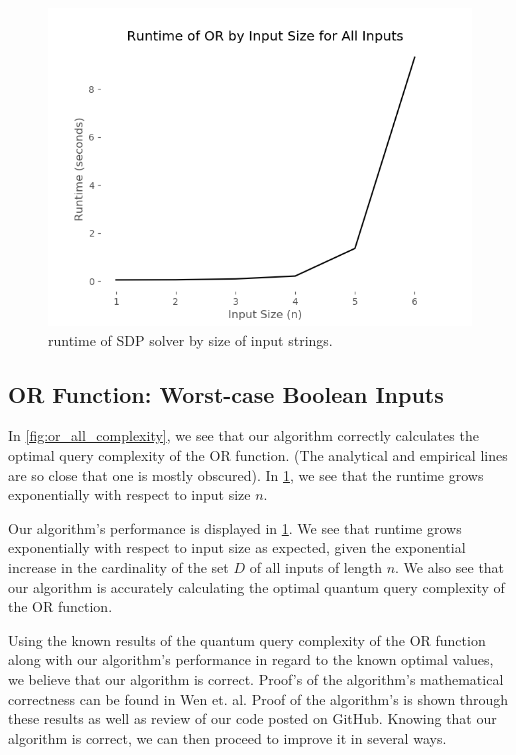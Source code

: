 \begin{figure}[ht]
\centering
\includegraphics[scale=.4]{figures/or_all_runtime.png}
\caption{runtime of SDP solver by size of input strings.}
\label{fig:or_all_runtime}
\end{figure}

\subsection{OR Function: Worst-case Boolean Inputs}\label{sec:speed}
In \cref{fig:or_all_complexity}, we see that our algorithm
correctly calculates the optimal query complexity of the OR function.
(The analytical and empirical lines are so close that one
is mostly obscured).
In \cref{fig:or_all_runtime}, we see that the runtime grows
exponentially with respect to input size $n$.

Our algorithm's performance is displayed in \cref{fig:or_all_runtime}.
We see that runtime grows exponentially with respect to input size as expected, 
given the exponential increase in the cardinality of the set $D$ of all
inputs of length $n$. 
We also see that our algorithm is accurately calculating the
optimal quantum query complexity of the OR function. 

Using the known results of the quantum query
complexity of the OR function along with our
algorithm's performance in regard to the known
optimal values, we believe that our algorithm is
correct. Proof's of the algorithm's mathematical
correctness can be found in Wen et. al. Proof of the
algorithm's is shown through these results as well as
review of our code posted on GitHub. Knowing that our
algorithm is correct, we can then proceed to improve
it in several ways. 

